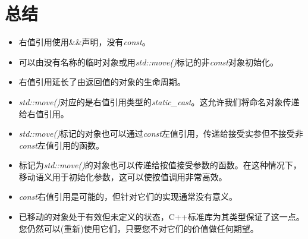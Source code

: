 \section{总结}
\begin{itemize}
	\item 右值引用使用\&\&声明，没有\textit{const}。
	\item 可以由没有名称的临时对象或用\textit{std::move()}标记的非\textit{const}对象初始化。
	\item 右值引用延长了由返回值的对象的生命周期。
	\item \textit{std::move()}对应的是右值引用类型的\textit{static_cast}。这允许我们将命名对象传递给右值引用。
	\item \textit{std::move()}标记的对象也可以通过\textit{const}左值引用，传递给接受实参但不接受非\textit{const}左值引用的函数。
	\item 标记为\textit{std::move()}的对象也可以传递给按值接受参数的函数。在这种情况下，移动语义用于初始化参数，这可以使按值调用非常高效。
	\item \textit{const}右值引用是可能的，但针对它们的实现通常没有意义。
	\item 已移动的对象处于有效但未定义的状态，C++标准库为其类型保证了这一点。您仍然可以(重新)使用它们，只要您不对它们的价值做任何期望。
\end{itemize}

